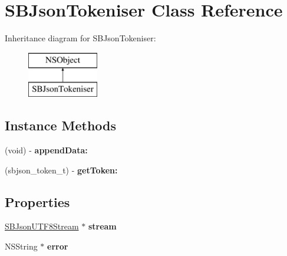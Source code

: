 \hypertarget{interface_s_b_json_tokeniser}{\section{S\-B\-Json\-Tokeniser Class Reference}
\label{interface_s_b_json_tokeniser}
}
Inheritance diagram for S\-B\-Json\-Tokeniser\-:\begin{figure}[H]
\begin{center}
\leavevmode
\includegraphics[height=2.000000cm]{interface_s_b_json_tokeniser}
\end{center}
\end{figure}
\subsection*{Instance Methods}
\begin{DoxyCompactItemize}
\item 
\hypertarget{interface_s_b_json_tokeniser_a8780ad4eed5b72b979dfbaf19bfbd39f}{(void) -\/ {\bfseries append\-Data\-:}}\label{interface_s_b_json_tokeniser_a8780ad4eed5b72b979dfbaf19bfbd39f}

\item 
\hypertarget{interface_s_b_json_tokeniser_a9244d283305dcafc6ec9c4ccfed91e1a}{(sbjson\-\_\-token\-\_\-t) -\/ {\bfseries get\-Token\-:}}\label{interface_s_b_json_tokeniser_a9244d283305dcafc6ec9c4ccfed91e1a}

\end{DoxyCompactItemize}
\subsection*{Properties}
\begin{DoxyCompactItemize}
\item 
\hypertarget{interface_s_b_json_tokeniser_aade292df1f9b5af8b184bf2b2f2e08e0}{\hyperlink{interface_s_b_json_u_t_f8_stream}{S\-B\-Json\-U\-T\-F8\-Stream} $\ast$ {\bfseries stream}}\label{interface_s_b_json_tokeniser_aade292df1f9b5af8b184bf2b2f2e08e0}

\item 
\hypertarget{interface_s_b_json_tokeniser_a4f58c75bf79fbaf6e699f10425403704}{N\-S\-String $\ast$ {\bfseries error}}\label{interface_s_b_json_tokeniser_a4f58c75bf79fbaf6e699f10425403704}

\end{DoxyCompactItemize}



